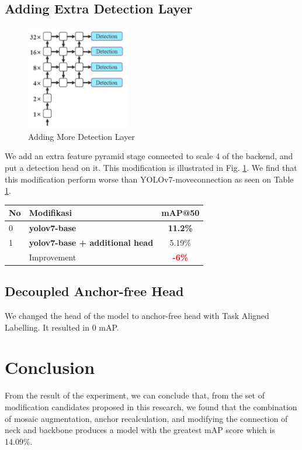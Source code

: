 \documentclass[conference]{IEEEtran}
\begin{document}
\subsection{Adding Extra Detection Layer}
\begin{figure}[htbp]
\centerline{\includegraphics[width=0.4\textwidth]{../book/figures/addhead.png}}
\caption{Adding More Detection Layer}
\label{fig:add-head-2}
\end{figure}
We add an extra feature pyramid stage connected to scale 4 of the backend, and put a detection head on it.
This modification is illustrated in Fig. \ref{fig:add-head-2}. We find that this modification
perform worse than YOLOv7-moveconnection as seen on Table \ref{tbl:addhead}.
\begin{table}[htbp]
  \centering
  \label{tbl:addhead}
  \vspace{-1ex}
  \begin{tabular}{ l l c }
    \toprule[1.5pt]
    No & Modifikasi                                 &mAP@50 \\
    \midrule
    0  & \textbf{yolov7-base}                       & \textbf{11.2\%}\\
    1  & \textbf{yolov7-base + additional head}       & 5.19\%\\
    \midrule
       & Improvement                                & \textbf{\textcolor{red}{-6\%}}\\
    \bottomrule[1.5pt]
  \end{tabular}
\end{table}

\subsection{Decoupled Anchor-free Head}
We changed the head of the model to anchor-free head with Task Aligned Labelling.
It resulted in 0 mAP.


\section{Conclusion}
From the result of the experiment, we can conclude that, from the set of modification
candidates proposed in this research, we found that the combination of mosaic augmentation,
anchor recalculation, and modifying the connection of neck and backbone produces a model
with the greatest mAP score which is 14.09\%.
\end{document}
